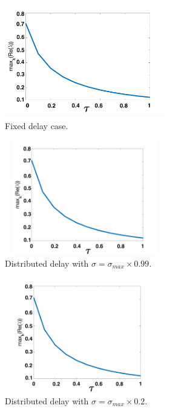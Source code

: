 \begin{figure}[H]
    \centering
    \begin{subfigure}[b]{0.45\textwidth}
        \centering
        \includegraphics[width=7cm,height=5cm]{p2fixed.png}
        \caption{Fixed delay case.}
        \label{}
    \end{subfigure}
    \hfill
    \begin{subfigure}[b]{0.45\textwidth}
        \centering
        \includegraphics[width=7cm,height=5cm]{p2sigmax.png}
        \caption{Distributed delay with $\sigma=\sigma_{max}\times0.99$.}
        \label{}
    \end{subfigure}
    \hfill
    \begin{subfigure}[b]{0.45\textwidth}
        \centering
        \includegraphics[width=7cm,height=5cm]{p2sigmax5.png}
        \caption{Distributed delay with $\sigma=\sigma_{max}\times0.2$.}
        \label{}
    \end{subfigure}
    \hfill
    \begin{subfigure}[b]{0.45\textwidth}
        \centering

\end{subfigure}
\end{figure}
